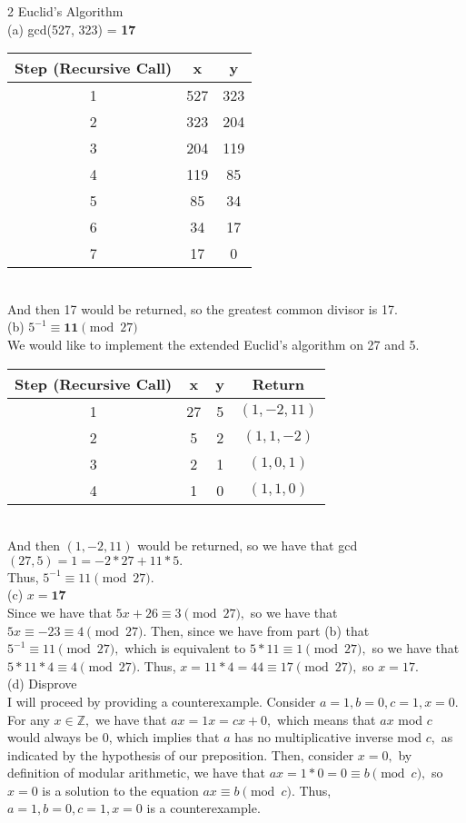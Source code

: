 \documentclass{article}
\begin{document}
{\Large 2 Euclid's Algorithm} \\[.5cm]
(a) gcd(527, 323) = \textbf{17} \\[.3cm]
\begin{tabular}{ | c || c | c | }
\hline
Step (Recursive Call) & x & y \\
\hline
1 & 527 & 323 \\
\hline
2 & 323 & 204 \\
\hline
3 & 204 & 119 \\
\hline
4 & 119 & 85 \\
\hline
5 & 85 & 34 \\
\hline
6 & 34 & 17 \\
\hline
7 & 17 & 0 \\
\hline
\end{tabular}\\[.3cm]
And then 17 would be returned, so the greatest common divisor is 17. \\[.5cm]
(b) $5^{-1}\equiv\textbf{11}\pmod{27}$ \\[.3cm]
We would like to implement the extended Euclid's algorithm on 27 and 5. \\[.3cm]
\begin{tabular}{ | c || c | c | c | }
\hline
Step (Recursive Call) & x & y & Return \\
\hline
1 & 27 & 5 & $(1, -2, 11)$ \\
\hline
2 & 5 & 2 & $(1, 1, -2)$ \\
\hline
3 & 2 & 1 & $(1, 0, 1)$ \\
\hline
4 & 1 & 0 & $(1, 1, 0)$ \\
\hline
\end{tabular}\\[.3cm]
And then $(1, -2, 11)$ would be returned, so we have that gcd$(27, 5) = 1 = -2 * 27 + 11 * 5.$ \\[.1cm]
Thus, $5^{-1}\equiv11\pmod{27}.$ \\[.5cm]
(c) $x = \textbf{17}$ \\[.3cm]
Since we have that $5x + 26\equiv3\pmod{27},$ so we have that $5x\equiv-23\equiv4\pmod{27}.$ Then, since we have from part (b) that $5^{-1}\equiv11\pmod{27},$ which is equivalent to $5*11\equiv1\pmod{27},$ so we have that $5 * 11 * 4\equiv4\pmod{27}.$ Thus, $x = 11 * 4 = 44\equiv17\pmod{27},$ so $x = 17.$ \\[.5cm]
(d) Disprove \\[.3cm]
I will proceed by providing a counterexample. Consider $a = 1, b = 0, c = 1, x = 0.$ \\[.1cm]
For any $x\in\mathbb{Z},$ we have that $ax = 1x = cx + 0,$ which means that $ax$ mod $c$ would always be 0, which implies that $a$ has no multiplicative inverse mod $c,$ as indicated by the hypothesis of our preposition. Then, consider $x = 0,$ by definition of modular arithmetic, we have that $ax = 1*0 = 0\equiv b\pmod{c},$ so $x = 0$ is a solution to the equation $ax\equiv b\pmod{c}.$ Thus, $a = 1, b = 0, c = 1, x = 0$ is a counterexample.
\end{document}
